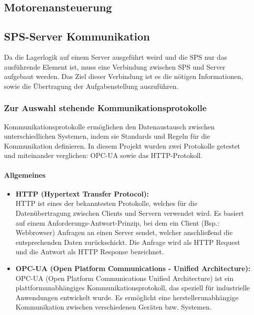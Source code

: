 \subsection{Motorenansteuerung}

\subsection{SPS-Server Kommunikation}
Da die Lagerlogik auf einem Server ausgeführt weird und die SPS nur das ausführende Element ist, muss eine Verbindung zwischen SPS und Server aufgebaut werden. Das Ziel dieser Verbindung ist es die nötigen Informationen, sowie die Übertragung der Aufgabenstellung auszuführen. 

    \subsubsection{Zur Auswahl stehende Kommunikationsprotokolle} 
    \label{Kommunikationsprotokolle}

    Kommunikationsprotokolle ermöglichen den Datenaustausch zwischen unterschiedlichen Systemen, indem sie Standards und Regeln für die Kommunikation definieren. In diesem Projekt wurden zwei Protokolle getestet und miteinander verglichen: OPC-UA sowie das HTTP-Protokoll.


    \paragraph{Allgemeines}

        \begin{itemize}
            \item \textbf{HTTP (Hypertext Transfer Protocol):}  \mbox{} \\
            HTTP ist eines der bekanntesten Protokolle, welches für die Datenübertragung zwischen Clients und Servern verwendet wird. Es basiert auf einem Anforderungs-Antwort-Prinzip, bei dem ein Client (Bsp.: Webbrowser) Anfragen an einen Server sendet, welcher anschließend die entsprechenden Daten zurückschickt. Die Anfrage wird als HTTP Request und die Antwort als HTTP Response bezeichnet.\cite{HTTP-Allgemein}
            
            \item \textbf{OPC-UA (Open Platform Communications - Unified Architecture):} \mbox{} \\
            OPC-UA (Open Platform Communications Unified Architecture) ist ein plattformunabhängiges Kommunikationsprotokoll, das speziell für industrielle Anwendungen entwickelt wurde. Es ermöglicht eine herstellerunabhängige Kommunikation zwischen verschiedenen Geräten bzw. Systemen. \cite{OPC-UA}
        \end{itemize}

